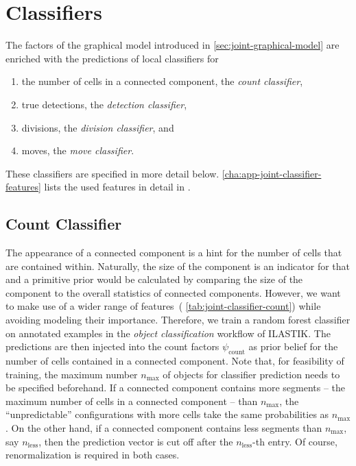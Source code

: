 \section{Classifiers}
\label{sec:joint-classifiers}
The factors of the graphical model introduced in \cref{sec:joint-graphical-model} are enriched with
the predictions of local classifiers for
\begin{enumerate}
      \item the number of cells in a connected component, the \emph{count classifier},
      \item true detections, the \emph{detection classifier},
      \item divisions, the \emph{division classifier}, and
      \item moves, the \emph{move classifier}.
\end{enumerate}
These classifiers are specified in more detail below. \cref{cha:app-joint-classifier-features} lists
the used features in detail in
.

\subsection{Count Classifier}
\label{sec:joint-classifier-count}
The appearance of a connected component is a hint for the number of cells that are contained
within. Naturally, the size of the component is an indicator for that and a primitive prior would be
calculated by comparing the size of the component to the overall statistics of connected
components. However, we want to make use of a wider range of features~(\cf
\cref{tab:joint-classifier-count}) while avoiding modeling their importance. Therefore, we train a
random forest classifier on annotated examples in the \emph{object classification} workflow of
ILASTIK. The predictions are then injected into the count factors $\psi_{\text{count}}$ as prior
belief for the number of cells contained in a connected component. Note that, for feasibility of
training, the maximum number $n_{\text{max}}$ of objects for classifier prediction needs to be
specified beforehand. If a connected component contains more segments -- \ie the maximum number of
cells in a connected component -- than $n_{\text{max}}$, the ``unpredictable'' configurations with
more cells take the same probabilities as $n_{\text{max}}$. On the other hand, if a connected
component contains less segments than $n_{\text{max}}$, say $n_{\text{less}}$, then the prediction
vector is cut off after the $n_{\text{less}}$-th entry. Of course, renormalization is required in
both cases.

